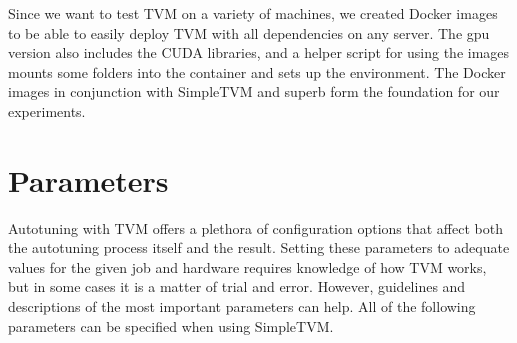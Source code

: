 Since we want to test TVM on a variety of machines, we created Docker images to be able to easily deploy TVM with all dependencies on any server. The \gls{gpu} version also includes the CUDA libraries, and a helper script for using the images mounts some folders into the container and sets up the environment. The Docker images in conjunction with SimpleTVM and superb form the foundation for our experiments.

\section{Parameters}
Autotuning with TVM offers a plethora of configuration options that affect both the autotuning process itself and the result. Setting these parameters to adequate values for the given job and hardware requires knowledge of how TVM works, but in some cases it is a matter of trial and error. However, guidelines and descriptions of the most important parameters can help. All of the following parameters can be specified when using SimpleTVM.
